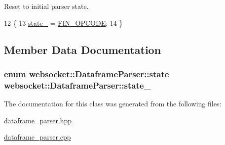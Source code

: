 Reset to initial parser state. 


\begin{DoxyCode}
12     \{
13         \hyperlink{classwebsocket_1_1DataframeParser_a46525ab8a38ba649b49faa6bf3b0c959}{state\_} = \hyperlink{classwebsocket_1_1DataframeParser_a2285d0f76dcfd6dadbe70a78c5e3de8aa29b00899c276193d6f18e8389b7592a3}{FIN\_OPCODE};
14     \}
\end{DoxyCode}


\subsection{Member Data Documentation}
\subsubsection[{\texorpdfstring{state\+\_\+}{state_}}]{\setlength{\rightskip}{0pt plus 5cm}enum {\bf websocket\+::\+Dataframe\+Parser\+::state}  websocket\+::\+Dataframe\+Parser\+::state\+\_\+\hspace{0.3cm}{\ttfamily [private]}}\hypertarget{classwebsocket_1_1DataframeParser_a46525ab8a38ba649b49faa6bf3b0c959}{}\label{classwebsocket_1_1DataframeParser_a46525ab8a38ba649b49faa6bf3b0c959}


The documentation for this class was generated from the following files\+:\begin{DoxyCompactItemize}
\item 
\hyperlink{dataframe__parser_8hpp}{dataframe\+\_\+parser.\+hpp}\item 
\hyperlink{dataframe__parser_8cpp}{dataframe\+\_\+parser.\+cpp}\end{DoxyCompactItemize}
